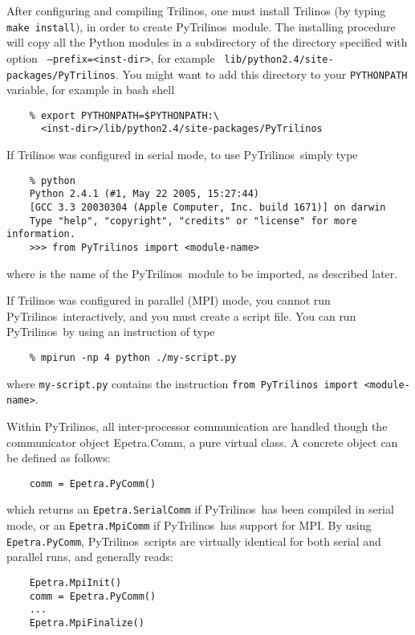 \documentclass[10pt,relax]{SANDreport}
\newcommand{\PyTrilinos}{{PyTrilinos}}
\begin{document}
After configuring and compiling Trilinos, one must install Trilinos
(by typing {\tt make install}), in order to create \PyTrilinos\ module.
The installing procedure will copy all the Python modules in a
subdirectory of the directory specified with option {\tt
  --prefix=<inst-dir>}, for example {\tt
  lib/python2.4/site-packages/PyTrilinos}. You might want to add this
directory to your {\tt PYTHONPATH} variable, for example in bash shell
\begin{verbatim}
    % export PYTHONPATH=$PYTHONPATH:\
      <inst-dir>/lib/python2.4/site-packages/PyTrilinos
\end{verbatim}

If Trilinos was configured in serial mode, to use \PyTrilinos\ simply
type
\begin{verbatim}
    % python
    Python 2.4.1 (#1, May 22 2005, 15:27:44) 
    [GCC 3.3 20030304 (Apple Computer, Inc. build 1671)] on darwin
    Type "help", "copyright", "credits" or "license" for more information.
    >>> from PyTrilinos import <module-name>
\end{verbatim}
where {\tt <module-name>} is the name of the \PyTrilinos\ module to be
imported, as described later.

If Trilinos was configured in parallel (MPI) mode, you cannot run
\PyTrilinos\ interactively, and you must create a script file. You can
run \PyTrilinos\ by using an instruction of type
\begin{verbatim}
    % mpirun -np 4 python ./my-script.py
\end{verbatim}
where {\tt my-script.py} contains the instruction {\tt from PyTrilinos
  import <module-name>}.

Within \PyTrilinos, all inter-processor communication are handled
though the communicator object Epetra.Comm, a pure virtual class. A
concrete object can be defined as follows:
\begin{verbatim}
    comm = Epetra.PyComm()
\end{verbatim}
which returns an {\tt Epetra.SerialComm} if \PyTrilinos\ has been compiled
in serial mode, or an {\tt Epetra.MpiComm} if \PyTrilinos\ has support for
MPI. By using {\tt Epetra.PyComm}, \PyTrilinos\ scripts are virtually
identical for both serial and parallel runs, and generally reads:
\begin{verbatim}
    Epetra.MpiInit()
    comm = Epetra.PyComm()
    ...
    Epetra.MpiFinalize()
\end{verbatim}

\end{document}
